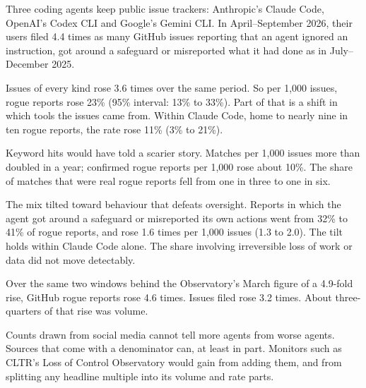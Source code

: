 
\begin{points}
\item Three coding agents keep public issue trackers: Anthropic’s Claude Code, OpenAI’s Codex CLI and Google’s Gemini CLI. In April–September 2026, their users filed 4.4 times as many GitHub issues reporting that an agent ignored an instruction, got around a safeguard or misreported what it had done as in July–December 2025.
\item Issues of every kind rose 3.6 times over the same period. So per 1,000 issues, rogue reports rose 23\% (95\% interval: 13\% to 33\%). Part of that is a shift in which tools the issues came from. Within Claude Code, home to nearly nine in ten rogue reports, the rate rose 11\% (3\% to 21\%).
\item Keyword hits would have told a scarier story. Matches per 1,000 issues more than doubled in a year; confirmed rogue reports per 1,000 rose about 10\%. The share of matches that were real rogue reports fell from one in three to one in six.
\item The mix tilted toward behaviour that defeats oversight. Reports in which the agent got around a safeguard or misreported its own actions went from 32\% to 41\% of rogue reports, and rose 1.6 times per 1,000 issues (1.3 to 2.0). The tilt holds within Claude Code alone. The share involving irreversible loss of work or data did not move detectably.
\item Over the same two windows behind the Observatory’s March figure of a 4.9-fold rise, GitHub rogue reports rose 4.6 times. Issues filed rose 3.2 times. About three-quarters of that rise was volume.
\item Counts drawn from social media cannot tell more agents from worse agents. Sources that come with a denominator can, at least in part. Monitors such as CLTR’s Loss of Control Observatory would gain from adding them, and from splitting any headline multiple into its volume and rate parts.
\end{points}


